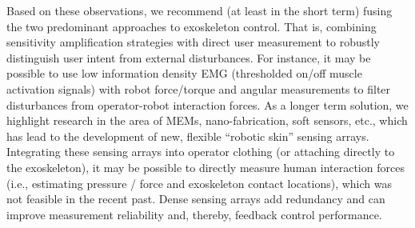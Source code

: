 \documentclass[letterpaper,12pt,fullpage]{article}
\begin{document}
Based on these observations, we recommend (at least in the short term) fusing the two predominant approaches to exoskeleton control. That is, combining sensitivity amplification strategies with direct user measurement to robustly distinguish user intent from external disturbances.
%
%
For instance, it may be possible to use low information density EMG (thresholded on/off muscle activation signals) with robot force/torque and angular measurements to filter disturbances from operator-robot interaction forces.  As a longer term solution, we highlight research in the area of MEMs, nano-fabrication, soft sensors, etc., which has lead to the development of new, flexible ``robotic skin'' sensing arrays.  Integrating these sensing arrays into operator clothing (or attaching directly to the exoskeleton), it may be possible to directly measure human interaction forces (i.e., estimating pressure / force and exoskeleton contact locations), which was not feasible in the recent past.  Dense sensing arrays add redundancy and can improve measurement reliability and, thereby, feedback control performance.
\end{document}
